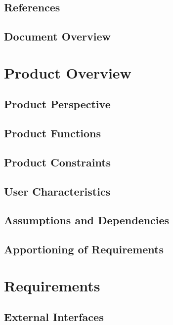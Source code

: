 \documentclass{article}
\begin{document}
\subsection{References}
\label{sub:references}

\begingroup
\raggedright

\endgroup


\subsection{Document Overview}


\section{Product Overview}


\subsection{Product Perspective}


\subsection{Product Functions}


\subsection{Product Constraints}

\subsection{User Characteristics}


\subsection{Assumptions and Dependencies}


\subsection{Apportioning of Requirements}


\section{Requirements}


\subsection{External Interfaces}
\end{document}
